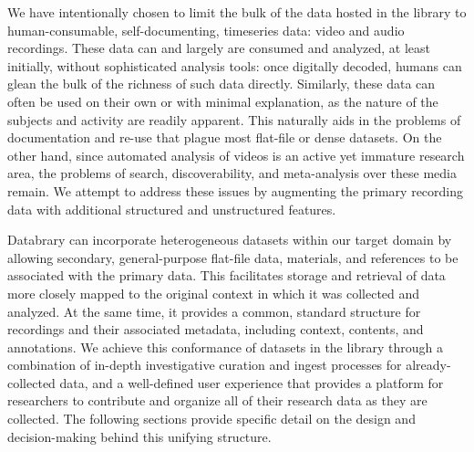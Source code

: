 \documentclass{sig-alternate}
\begin{document}
We have intentionally chosen to limit the bulk of the data hosted in the library to human-consumable, self-documenting, timeseries data: video and audio recordings.
These data can and largely are consumed and analyzed, at least initially, without sophisticated analysis tools: once digitally decoded, humans can glean the bulk of the richness of such data directly.
Similarly, these data can often be used on their own or with minimal explanation, as the nature of the subjects and activity are readily apparent.
This naturally aids in the problems of documentation and re-use that plague most flat-file or dense datasets.
On the other hand, since automated analysis of videos is an active yet immature research area, the problems of search, discoverability, and meta-analysis over these media remain.
We attempt to address these issues by augmenting the primary recording data with additional structured and unstructured features.

Databrary can incorporate heterogeneous datasets within our target domain by allowing secondary, general-purpose flat-file data, materials, and references to be associated with the primary data.
This facilitates storage and retrieval of data more closely mapped to the original context in which it was collected and analyzed.
At the same time, it provides a common, standard structure for recordings and their associated metadata, including context, contents, and annotations.
We achieve this conformance of datasets in the library through a combination of in-depth investigative curation and ingest processes for already-collected data, and a well-defined user experience that provides a platform for researchers to contribute and organize all of their research data as they are collected.
The following sections provide specific detail on the design and decision-making behind this unifying structure.
\end{document}
